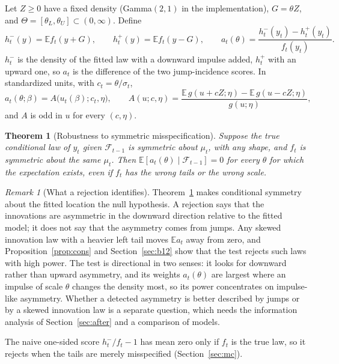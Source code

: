 \documentclass[11pt,a4paper]{article}
\newtheorem{theorem}{Theorem}
\theoremstyle{definition}
\theoremstyle{remark}
\newtheorem{remark}{Remark}
\newcommand{\E}{\mathbb{E}}
\newcommand{\F}{\mathcal{F}}
\begin{document}
Let $Z\ge0$ have a fixed density (Gamma$(2,1)$ in the implementation), $G=\theta Z$, and $\Theta=[\theta_L,\theta_U]\subset(0,\infty)$. Define
\[
h^-_t(y)=\E f_t(y+G),\qquad h^+_t(y)=\E f_t(y-G),\qquad a_t(\theta)=\frac{h^-_t(y_t)-h^+_t(y_t)}{f_t(y_t)} .
\]
$h^-_t$ is the density of the fitted law with a downward impulse added, $h^+_t$ with an upward one, so $a_t$ is the difference of the two jump-incidence scores. In standardized units, with $c_t=\theta/\sigma_t$,
\begin{equation}\label{eq:a}
a_t(\theta;\beta)=A\big(u_t(\beta);c_t,\eta\big),\qquad A(u;c,\eta)=\frac{\E\,g(u+cZ;\eta)-\E\,g(u-cZ;\eta)}{g(u;\eta)},
\end{equation}
and $A$ is odd in $u$ for every $(c,\eta)$.

\begin{theorem}[Robustness to symmetric misspecification]\label{thm:symm}
Suppose the true conditional law of $y_t$ given $\F_{t-1}$ is symmetric about $\mu_t$, with any shape, and $f_t$ is symmetric about the same $\mu_t$. Then $\E[a_t(\theta)\mid\F_{t-1}]=0$ for every $\theta$ for which the expectation exists, even if $f_t$ has the wrong tails or the wrong scale.
\end{theorem}


\begin{remark}[What a rejection identifies]\label{rem:identifies}
Theorem~\ref{thm:symm} makes conditional symmetry about the fitted location the null hypothesis. A rejection says that the innovations are asymmetric in the downward direction relative to the fitted model; it does not say that the asymmetry comes from jumps. Any skewed innovation law with a heavier left tail moves $\E a_t$ away from zero, and Proposition~\ref{prop:cons} and Section~\ref{sec:b12} show that the test rejects such laws with high power. The test is directional in two senses: it looks for downward rather than upward asymmetry, and its weights $a_t(\theta)$ are largest where an impulse of scale $\theta$ changes the density most, so its power concentrates on impulse-like asymmetry. Whether a detected asymmetry is better described by jumps or by a skewed innovation law is a separate question, which needs the information analysis of Section~\ref{sec:after} and a comparison of models.
\end{remark}
\noindent The naive one-sided score $h^-_t/f_t-1$ has mean zero only if $f_t$ is the true law, so it rejects when the tails are merely misspecified (Section~\ref{sec:mc}).
\end{document}
